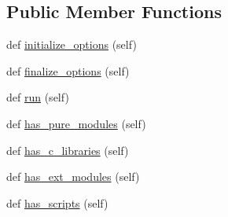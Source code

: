 \subsection*{Public Member Functions}
\begin{DoxyCompactItemize}
\item 
def \hyperlink{classsetuptools_1_1__distutils_1_1command_1_1build_1_1build_a3e119f4e80d6d0cb30d517176fcbc93d}{initialize\+\_\+options} (self)
\item 
def \hyperlink{classsetuptools_1_1__distutils_1_1command_1_1build_1_1build_af3bf5ecebb84095776b02df5b4dcaa19}{finalize\+\_\+options} (self)
\item 
def \hyperlink{classsetuptools_1_1__distutils_1_1command_1_1build_1_1build_a8629055596c257f39bad28eb04cc64d7}{run} (self)
\item 
def \hyperlink{classsetuptools_1_1__distutils_1_1command_1_1build_1_1build_a2c6e628f718201066c5d0e22c7348913}{has\+\_\+pure\+\_\+modules} (self)
\item 
def \hyperlink{classsetuptools_1_1__distutils_1_1command_1_1build_1_1build_a680bdee77d9f3ee9c516fabdb04c000b}{has\+\_\+c\+\_\+libraries} (self)
\item 
def \hyperlink{classsetuptools_1_1__distutils_1_1command_1_1build_1_1build_afb064c515cab59f59c0ca51f7f750707}{has\+\_\+ext\+\_\+modules} (self)
\item 
def \hyperlink{classsetuptools_1_1__distutils_1_1command_1_1build_1_1build_a581554e1470b14bf86ccb7832cf13fe5}{has\+\_\+scripts} (self)
\end{DoxyCompactItemize}
